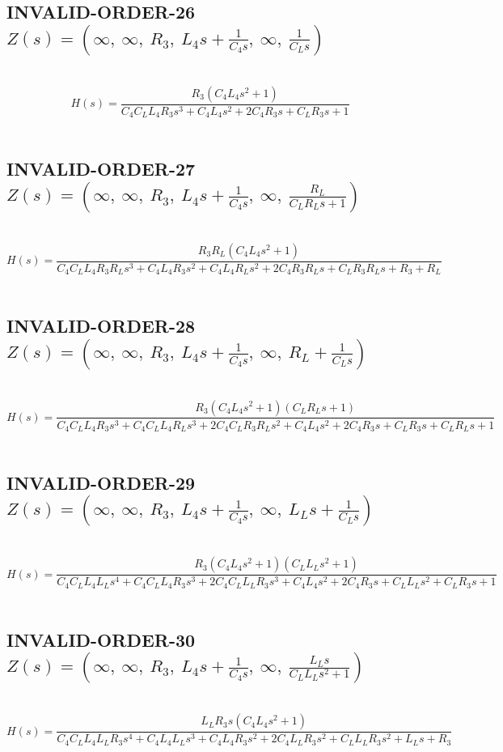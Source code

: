 \documentclass{article}
\begin{document}
\subsection{INVALID-ORDER-26 $Z(s) = \left( \infty, \  \infty, \  R_{3}, \  L_{4} s + \frac{1}{C_{4} s}, \  \infty, \  \frac{1}{C_{L} s}\right)$ } \ 
\textbf{\[H(s) = \frac{R_{3} \left(C_{4} L_{4} s^{2} + 1\right)}{C_{4} C_{L} L_{4} R_{3} s^{3} + C_{4} L_{4} s^{2} + 2 C_{4} R_{3} s + C_{L} R_{3} s + 1}\] } \ 
\subsection{INVALID-ORDER-27 $Z(s) = \left( \infty, \  \infty, \  R_{3}, \  L_{4} s + \frac{1}{C_{4} s}, \  \infty, \  \frac{R_{L}}{C_{L} R_{L} s + 1}\right)$ } \ 
\textbf{\[H(s) = \frac{R_{3} R_{L} \left(C_{4} L_{4} s^{2} + 1\right)}{C_{4} C_{L} L_{4} R_{3} R_{L} s^{3} + C_{4} L_{4} R_{3} s^{2} + C_{4} L_{4} R_{L} s^{2} + 2 C_{4} R_{3} R_{L} s + C_{L} R_{3} R_{L} s + R_{3} + R_{L}}\] } \ 
\subsection{INVALID-ORDER-28 $Z(s) = \left( \infty, \  \infty, \  R_{3}, \  L_{4} s + \frac{1}{C_{4} s}, \  \infty, \  R_{L} + \frac{1}{C_{L} s}\right)$ } \ 
\textbf{\[H(s) = \frac{R_{3} \left(C_{4} L_{4} s^{2} + 1\right) \left(C_{L} R_{L} s + 1\right)}{C_{4} C_{L} L_{4} R_{3} s^{3} + C_{4} C_{L} L_{4} R_{L} s^{3} + 2 C_{4} C_{L} R_{3} R_{L} s^{2} + C_{4} L_{4} s^{2} + 2 C_{4} R_{3} s + C_{L} R_{3} s + C_{L} R_{L} s + 1}\] } \ 
\subsection{INVALID-ORDER-29 $Z(s) = \left( \infty, \  \infty, \  R_{3}, \  L_{4} s + \frac{1}{C_{4} s}, \  \infty, \  L_{L} s + \frac{1}{C_{L} s}\right)$ } \ 
\textbf{\[H(s) = \frac{R_{3} \left(C_{4} L_{4} s^{2} + 1\right) \left(C_{L} L_{L} s^{2} + 1\right)}{C_{4} C_{L} L_{4} L_{L} s^{4} + C_{4} C_{L} L_{4} R_{3} s^{3} + 2 C_{4} C_{L} L_{L} R_{3} s^{3} + C_{4} L_{4} s^{2} + 2 C_{4} R_{3} s + C_{L} L_{L} s^{2} + C_{L} R_{3} s + 1}\] } \ 
\subsection{INVALID-ORDER-30 $Z(s) = \left( \infty, \  \infty, \  R_{3}, \  L_{4} s + \frac{1}{C_{4} s}, \  \infty, \  \frac{L_{L} s}{C_{L} L_{L} s^{2} + 1}\right)$ } \ 
\textbf{\[H(s) = \frac{L_{L} R_{3} s \left(C_{4} L_{4} s^{2} + 1\right)}{C_{4} C_{L} L_{4} L_{L} R_{3} s^{4} + C_{4} L_{4} L_{L} s^{3} + C_{4} L_{4} R_{3} s^{2} + 2 C_{4} L_{L} R_{3} s^{2} + C_{L} L_{L} R_{3} s^{2} + L_{L} s + R_{3}}\] } \ 
\end{document}
